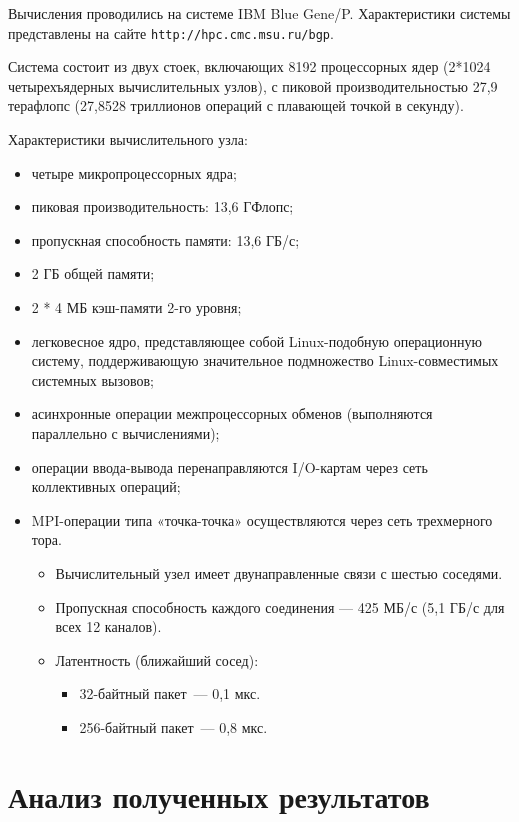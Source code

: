 \documentclass[oneside,final,14pt]{extreport}
\begin{document}
Вычисления проводились на системе IBM Blue Gene/P.
Характеристики системы представлены на сайте \verb|http://hpc.cmc.msu.ru/bgp|.

Система состоит из двух стоек, включающих 8192 процессорных ядер
(2*1024 четырехъядерных вычислительных узлов), с пиковой производительностью
27,9 терафлопс (27,8528 триллионов операций с плавающей точкой в секунду).

Характеристики вычислительного узла:

\begin{itemize}
    \item четыре микропроцессорных ядра;
    \item пиковая производительность: 13,6 ГФлопс;
    \item пропускная способность памяти: 13,6 ГБ/с;
    \item 2 ГБ общей памяти;
    \item 2 * 4 МБ кэш-памяти 2-го уровня;
    \item легковесное ядро, представляющее собой Linux-подобную операционную систему,
        поддерживающую значительное подмножество Linux-совместимых системных вызовов;
    \item асинхронные операции межпроцессорных обменов (выполняются параллельно с вычислениями);
    \item операции ввода-вывода перенаправляются I/O-картам через сеть коллективных операций;
    \item MPI-операции типа «точка-точка» осуществляются через сеть трехмерного тора.
        \begin{itemize}
            \item Вычислительный узел имеет двунаправленные связи с шестью соседями.
            \item Пропускная способность каждого соединения — 425 МБ/с (5,1 ГБ/с для всех 12
        каналов).
            \item Латентность (ближайший сосед):
                \begin{itemize}
                    \item 32-байтный пакет~--- 0,1 мкс.
                    \item 256-байтный пакет~--- 0,8 мкс.
                \end{itemize}
        \end{itemize}
\end{itemize}


\chapter*{Анализ полученных результатов}
\end{document}
